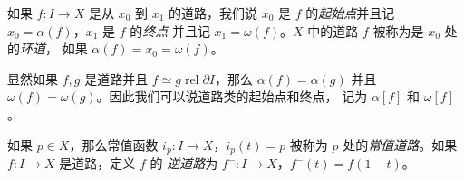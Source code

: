 \documentclass[fontset=none]{Notes}
\DeclareMathOperator\rel{rel}
\newcommand{\partI}{\partial I}
\newcommand{\relhomo}{\rel\partI}
\begin{document}
\begin{definition}
  如果 $f:I\to X$ 是从 $x_0$ 到 $x_1$ 的道路，我们说 $x_0$ 是 $f$
  的\emph{起始点}并且记 $x_0=\alpha(f)$，$x_1$ 是 $f$ 的\emph{终点}
  并且记 $x_1=\omega(f)$。$X$ 中的道路 $f$ 被称为是 $x_0$ 处的\emph{环道}，
  如果 $\alpha(f)=x_0=\omega(f)$。
\end{definition}

显然如果 $f,g$ 是道路并且 $f\simeq g\relhomo$，那么 $\alpha(f)=\alpha(g)$
并且 $\omega(f)=\omega(g)$。因此我们可以说道路类的起始点和终点，
记为 $\alpha[f]$ 和 $\omega[f]$。

\begin{definition}
  如果 $p\in X$，那么常值函数 $i_p:I\to X$，$i_p(t)=p$ 被称为
  $p$ 处的\emph{常值道路}。如果 $f:I\to X$ 是道路，定义 $f$ 的
  \emph{逆道路}为 $f^-:I\to X$，$f^-(t)=f(1-t)$。
\end{definition}
\end{document}
